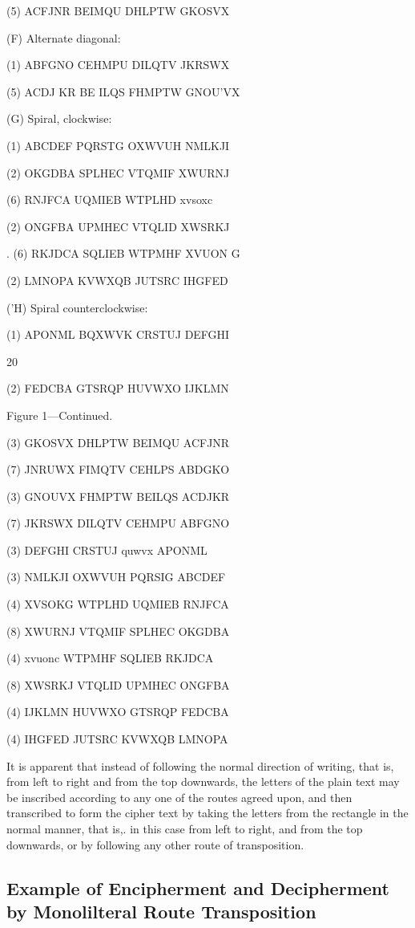 (5)
ACFJNR
BEIMQU
DHLPTW
GKOSVX

(F) Alternate diagonal:

(1)
ABFGNO
CEHMPU
DILQTV
JKRSWX

(5)
ACDJ KR
BE ILQS
FHMPTW
GNOU'VX

(G) Spiral, clockwise:

(1)
ABCDEF
PQRSTG
OXWVUH
NMLKJI

(2)
OKGDBA
SPLHEC
VTQMIF
XWURNJ

(6)
RNJFCA
UQMIEB
WTPLHD
xvsoxc

(2)
ONGFBA
UPMHEC
VTQLID
XWSRKJ

. (6)
RKJDCA
SQLIEB
WTPMHF
XVUON G

(2)
LMNOPA
KVWXQB
JUTSRC
IHGFED

('H) Spiral counterclockwise:

(1)
APONML
BQXWVK
CRSTUJ
DEFGHI

20

(2)
FEDCBA
GTSRQP
HUVWXO
IJKLMN

Figure 1—Continued.

(3)
GKOSVX
DHLPTW
BEIMQU
ACFJNR

(7)
JNRUWX
FIMQTV
CEHLPS
ABDGKO

(3)
GNOUVX
FHMPTW
BEILQS
ACDJKR

(7)
JKRSWX
DILQTV
CEHMPU
ABFGNO

(3)
DEFGHI
CRSTUJ
quwvx
APONML

(3)
NMLKJI
OXWVUH
PQRSIG
ABCDEF

(4)
XVSOKG
WTPLHD
UQMIEB
RNJFCA

(8)
XWURNJ
VTQMIF
SPLHEC
OKGDBA

(4)
xvuonc
WTPMHF
SQLIEB
RKJDCA

(8)
XWSRKJ
VTQLID
UPMHEC
ONGFBA

(4)
IJKLMN
HUVWXO
GTSRQP
FEDCBA

(4)
IHGFED
JUTSRC
KVWXQB
LMNOPA

 


\mypara It is apparent that instead of following the normal direction of
writing, that is, from left to right and from the top downwards, the
letters of the plain text may be inscribed according to any one of the
routes agreed upon, and then transcribed to form the cipher text by
taking the letters from the rectangle in the normal manner, that is,. in
this case from left to right, and from the top downwards, or by following any other route of transposition.

\subsection{Example of Encipherment and Decipherment by Monolilteral Route Transposition}

